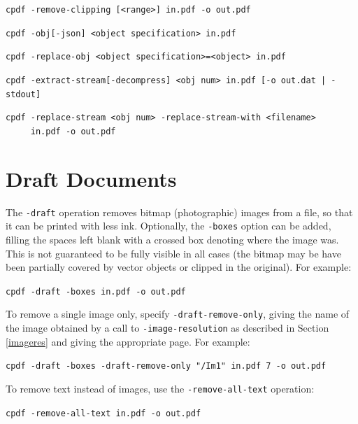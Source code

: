 \documentclass{book}
\begin{document}
{\begin{framed}
  \vspace{1.5mm}
  \noindent\verb!cpdf -remove-clipping [<range>] in.pdf -o out.pdf!

  \vspace{1.5mm}
  \noindent\verb!cpdf -obj[-json] <object specification> in.pdf!

  \vspace{1.5mm}
  \noindent\verb!cpdf -replace-obj <object specification>=<object> in.pdf!

  \vspace{1.5mm}
  \noindent\verb!cpdf -extract-stream[-decompress] <obj num> in.pdf [-o out.dat | -stdout]!

  \vspace{1.5mm}
  \noindent\verb!cpdf -replace-stream <obj num> -replace-stream-with <filename>!\\
  \noindent\verb!     in.pdf -o out.pdf!\end{framed}}
  \section{Draft Documents}
\label{draft}
    The \texttt{-draft} operation removes bitmap (photographic) images from a
file, so that it can be printed with less ink. Optionally, the
\texttt{-boxes} option can be added, filling the spaces left blank with a
crossed box denoting where the image was. This is not guaranteed to be fully
visible in all cases (the bitmap may be have been partially covered by vector
objects or clipped in the original). For example:

  \begin{framed}
    \noindent\small\verb!cpdf -draft -boxes in.pdf -o out.pdf!
  \end{framed}

\noindent To remove a single image only, specify \texttt{-draft-remove-only}, giving the name of the image obtained by a call to \texttt{-image-resolution} as described in Section \ref{imageres} and giving the appropriate page. For example:

  \begin{framed}
    \noindent\small\verb!cpdf -draft -boxes -draft-remove-only "/Im1" in.pdf 7 -o out.pdf!
  \end{framed}

\noindent To remove text instead of images, use the \texttt{-remove-all-text} operation:

  \begin{framed}
    \noindent\small\verb!cpdf -remove-all-text in.pdf -o out.pdf!
  \end{framed}
\end{document}
